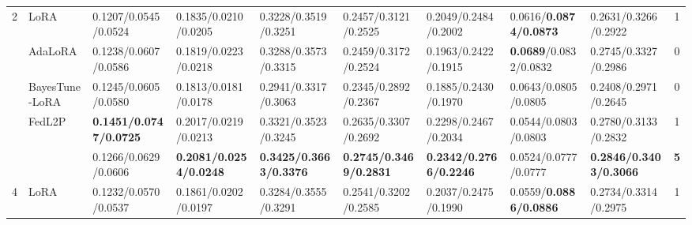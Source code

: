 \begin{table*}[t]
\begin{scriptsize}
{\begin{tabular}{c|l|l|l|l|l|l|l|l|c}
\multirow{5}{*}{2}  & LoRA                                   & 0.1207/0.0545/0.0524             & 0.1835/0.0210/0.0205              & 0.3228/0.3519/0.3251             & 0.2457/0.3121/0.2525             & 0.2049/0.2484/0.2002             & 0.0616/\textbf{0.0874/0.0873}             & 0.2631/0.3266/0.2922                                         & 1             \\ %
                    & AdaLoRA                              & 0.1238/0.0607/0.0586             & 0.1819/0.0223/0.0218             & 0.3288/0.3573/0.3315             & 0.2459/0.3172/0.2524             & 0.1963/0.2422/0.1915             & \textbf{0.0689}/0.0832/0.0832    & 0.2745/0.3327/0.2986                                         & 0             \\ %
                    & BayesTune-LoRA                            & 0.1245/0.0605/0.0580              & 0.1813/0.0181/0.0178             & 0.2941/0.3317/0.3063             & 0.2345/0.2892/0.2367             & 0.1885/0.2430/0.1970               & 0.0643/0.0805/0.0805             & 0.2408/0.2971/0.2645                                         & 0             \\ %
                    & FedL2P                               & \textbf{0.1451/0.0747/0.0725}    & 0.2017/0.0219/0.0213             & 0.3321/0.3523/0.3245             & 0.2635/0.3307/0.2692             & 0.2298/0.2467/0.2034             & 0.0544/0.0803/0.0803             & 0.2780/0.3133/0.2832                                          & 1             \\ %
                    & \method{}                                 & 0.1266/0.0629/0.0606             & \textbf{0.2081/0.0254/0.0248}    & \textbf{0.3425/0.3663/0.3376}    & \textbf{0.2745/0.3469/0.2831}    & \textbf{0.2342/0.2766/0.2246}    & 0.0524/0.0777/0.0777             & \textbf{0.2846/0.3403/0.3066}                                & \textbf{5}    \\ \hline
\multirow{5}{*}{4}  & LoRA                                   & 0.1232/0.0570/0.0537              & 0.1861/0.0202/0.0197             & 0.3284/0.3555/0.3291             & 0.2541/0.3202/0.2585             & 0.2037/0.2475/0.1990              & 0.0559/\textbf{0.0886/0.0886}             & 0.2734/0.3314/0.2975                                         & 1             \\ %

\end{tabular}}
\end{scriptsize}
\end{table*}
